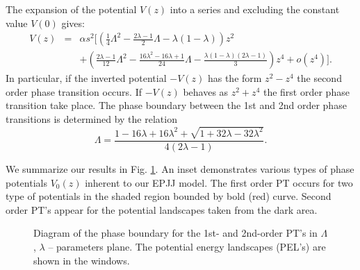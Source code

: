 \documentclass[aps, pre, preprint, groupedaddress, superscriptaddress, showkeys, showpacs] {revtex4-1}
\begin{document}
The expansion of the potential $V(z)$ into a series and excluding the constant value $V(0)$ gives:
%
\begin{equation}
\begin{array}{lcl}
V(z) & = & \alpha s^2 \Big[ \left( \frac{1}{4} \Lambda^2  - \frac{2\lambda - 1}{2} \Lambda - \lambda (1 - \lambda) \right) z^2 \\
&& + \left( \frac{2\lambda - 1}{12} \Lambda^2 - \frac{16\lambda^2 - 16\lambda + 1}{24} \Lambda - \frac{\lambda (1 - \lambda) (2\lambda - 1)}{3} \right) z^4 + o(z^4) \Big].
\end{array}
\label{eq:potential_teylor}
\end{equation}
%
In particular, if the inverted potential $-V(z)$ has the form $z^2 - z^4$ the second order phase transition occurs.
If $-V(z)$ behaves as $z^2 + z^4$ the first order phase transition take place.
The phase boundary between the 1st and 2nd order phase transitions is determined by the relation
%
\begin{equation}
\Lambda = \frac{1 - 16\lambda + 16\lambda^2 + \sqrt{1 + 32\lambda - 32\lambda^2}}{4(2\lambda - 1)}.
\label{eq:order_border}
\end{equation}
%

We summarize our results in Fig. \ref{pic:phase_boundary_combined}. An inset demonstrates various types of  phase potentials $V_0(z)$ inherent to our EPJJ model. The first order PT occurs for two type of potentials in the shaded region bounded by bold  (red) curve.  Second order PT's appear for the potential landscapes taken from the dark area. 
%
\begin{figure}[ht]
\caption{Diagram of the phase boundary for the 1st- and 2nd-order PT's in $\Lambda$, $\lambda$ -- parameters plane.
The potential energy landscapes (PEL's) are shown in the windows. \label{pic:phase_boundary_combined}}
\end{figure}
%
\end{document}
